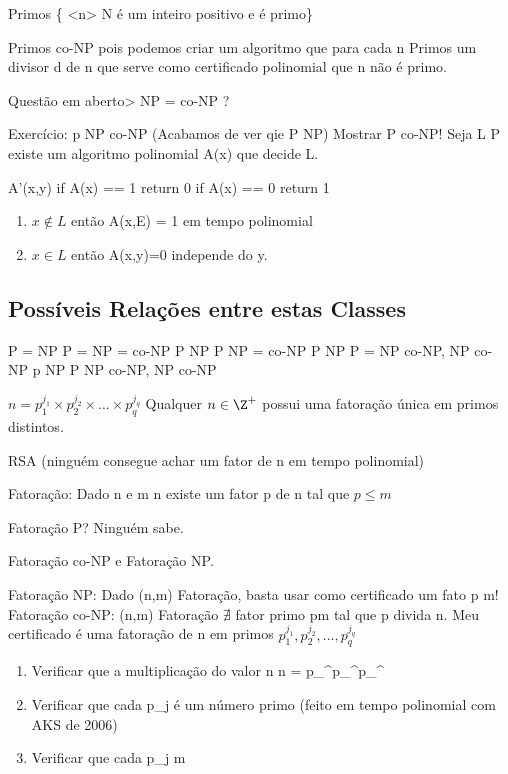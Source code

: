 \documentclass[a4paper,oneside,article,table]{article}
\begin{document}
        Primos \{ <n> N é um inteiro positivo e é primo\}

        Primos \in co-NP pois podemos criar um algoritmo que para cada n \neq Primos \rightarrow \exists um divisor d de n que serve como certificado polinomial que n não é primo.

        Questão em aberto> NP = co-NP ?

        Exercício: p \subseteq NP \cap co-NP (Acabamos de ver qie P \subseteq NP)
        Mostrar P \subseteq co-NP! Seja L \in P \rightarrow existe um algoritmo polinomial A(x) que decide L.

        A'(x,y)
            if A(x) == 1 return 0
            if A(x) == 0 return 1

        \begin{enumerate}
            \item $x \notin L$ então A(x,E) = 1 em tempo polinomial
            \item $x \in L$ então A(x,y)=0 independe do y.
        \end{enumerate}

        \subsection{Possíveis Relações entre estas Classes}

        P = NP \rightarrow P = NP = co-NP
        P \neq NP \rightarrow P \in NP = co-NP
        P \neq NP \rightarrow P = NP \bigcap co-NP, NP \neq co-NP
        p \neq NP \rightarrow P \subset NP \bigcap co-NP, NP \neq co-NP

        $n = p_{1}^{j_1} \times p_{2}^{j_2} \times \ldots \times p_{q}^{j_q}$
        Qualquer $n \in \Z^+$ possui uma fatoração única em primos distintos.

        RSA (ninguém consegue achar um fator de n em tempo polinomial)

        Fatoração: Dado n e m \leq n existe um fator p de n tal que $p \leq m$

        Fatoração \in P? Ninguém sabe.

        Fatoração \in co-NP e Fatoração \in NP.

        Fatoração \in NP: Dado (n,m) \in Fatoração, basta usar como certificado um fato p \leq m!
        Fatoração \in co-NP: (n,m) \notin Fatoração \rightarrow $\nexists$ fator primo p\leq m tal que p divida n. Meu certificado é uma fatoração de n em primos $p_{1}^{j_1}, p_{2}^{j_2}, \ldots, p_{q}^{j_q}$

        \begin{enumerate}
            \item Verificar que a multiplicação do valor n
                n = p_{}^{}p_{}^{}p_{}^{}

            \item Verificar que cada p_j é um número primo (feito em tempo polinomial com AKS de 2006)
            \item Verificar que cada p_j \ge m
        \end{enumerate}
\end{document}
